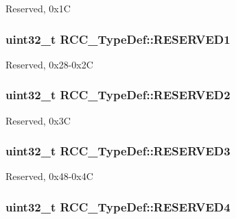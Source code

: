 Reserved, 0x1\-C \hypertarget{struct_r_c_c___type_def_ab9fc98b9a09130bf1922feb019bba6f3}{
\subsubsection[{R\-E\-S\-E\-R\-V\-E\-D1}]{\setlength{\rightskip}{0pt plus 5cm}uint32\-\_\-t R\-C\-C\-\_\-\-Type\-Def\-::\-R\-E\-S\-E\-R\-V\-E\-D1}}\label{struct_r_c_c___type_def_ab9fc98b9a09130bf1922feb019bba6f3}
Reserved, 0x28-\/0x2\-C \hypertarget{struct_r_c_c___type_def_a94cb7e7b923ebacab99c967d0f808235}{
\subsubsection[{R\-E\-S\-E\-R\-V\-E\-D2}]{\setlength{\rightskip}{0pt plus 5cm}uint32\-\_\-t R\-C\-C\-\_\-\-Type\-Def\-::\-R\-E\-S\-E\-R\-V\-E\-D2}}\label{struct_r_c_c___type_def_a94cb7e7b923ebacab99c967d0f808235}
Reserved, 0x3\-C \hypertarget{struct_r_c_c___type_def_a3e2ab1ff9369e5b9a037555f7b899a44}{
\subsubsection[{R\-E\-S\-E\-R\-V\-E\-D3}]{\setlength{\rightskip}{0pt plus 5cm}uint32\-\_\-t R\-C\-C\-\_\-\-Type\-Def\-::\-R\-E\-S\-E\-R\-V\-E\-D3}}\label{struct_r_c_c___type_def_a3e2ab1ff9369e5b9a037555f7b899a44}
Reserved, 0x48-\/0x4\-C \hypertarget{struct_r_c_c___type_def_a0f009e4bd1777ac1b86ca27e23361a0e}{
\subsubsection[{R\-E\-S\-E\-R\-V\-E\-D4}]{\setlength{\rightskip}{0pt plus 5cm}uint32\-\_\-t R\-C\-C\-\_\-\-Type\-Def\-::\-R\-E\-S\-E\-R\-V\-E\-D4}}\label{struct_r_c_c___type_def_a0f009e4bd1777ac1b86ca27e23361a0e}
